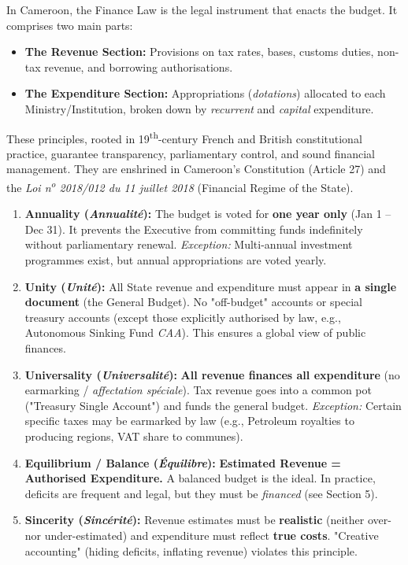 \documentclass[11pt]{article}
\newcounter{popsec}
\newcounter{popsub}
\newcommand{\courssub}[1]{%
  \stepcounter{popsub}%
  \par\vspace{9pt}\noindent{\popxbold\fontsize{11.5}{13}\selectfont\color{popink}{\color{poporange}\thepopsec.\thepopsub}\hspace{6pt}#1}\par\nopagebreak\vspace{4pt}
}
\begin{document}
\begin{definition}
In Cameroon, the Finance Law is the legal instrument that enacts the budget. It comprises two main parts:
\begin{itemize}
    \item \textbf{The Revenue Section:} Provisions on tax rates, bases, customs duties, non-tax revenue, and borrowing authorisations.
    \item \textbf{The Expenditure Section:} Appropriations (\emph{dotations}) allocated to each Ministry/Institution, broken down by \emph{recurrent} and \emph{capital} expenditure.
\end{itemize}
\end{definition}

\courssub{Classical Budgetary Principles}

These principles, rooted in 19\textsuperscript{th}-century French and British constitutional practice, guarantee transparency, parliamentary control, and sound financial management. They are enshrined in Cameroon's Constitution (Article 27) and the \emph{Loi n\textsuperscript{o} 2018/012 du 11 juillet 2018} (Financial Regime of the State).

\begin{propriete}
\begin{enumerate}
    \item \textbf{Annuality (\emph{Annualité}):} The budget is voted for \textbf{one year only} (Jan 1 – Dec 31). It prevents the Executive from committing funds indefinitely without parliamentary renewal. \textit{Exception:} Multi-annual investment programmes exist, but annual appropriations are voted yearly.
    \item \textbf{Unity (\emph{Unité}):} All State revenue and expenditure must appear in \textbf{a single document} (the General Budget). No "off-budget" accounts or special treasury accounts (except those explicitly authorised by law, e.g., Autonomous Sinking Fund \emph{CAA}). This ensures a global view of public finances.
    \item \textbf{Universality (\emph{Universalité}):} \textbf{All revenue finances all expenditure} (no earmarking / \emph{affectation spéciale}). Tax revenue goes into a common pot ("Treasury Single Account") and funds the general budget. \textit{Exception:} Certain specific taxes may be earmarked by law (e.g., Petroleum royalties to producing regions, VAT share to communes).
    \item \textbf{Equilibrium / Balance (\emph{Équilibre}):} \textbf{Estimated Revenue = Authorised Expenditure.} A balanced budget is the ideal. In practice, deficits are frequent and legal, but they must be \emph{financed} (see Section 5).
    \item \textbf{Sincerity (\emph{Sincérité}):} Revenue estimates must be \textbf{realistic} (neither over- nor under-estimated) and expenditure must reflect \textbf{true costs}. "Creative accounting" (hiding deficits, inflating revenue) violates this principle.
\end{enumerate}
\end{propriete}
\end{document}
